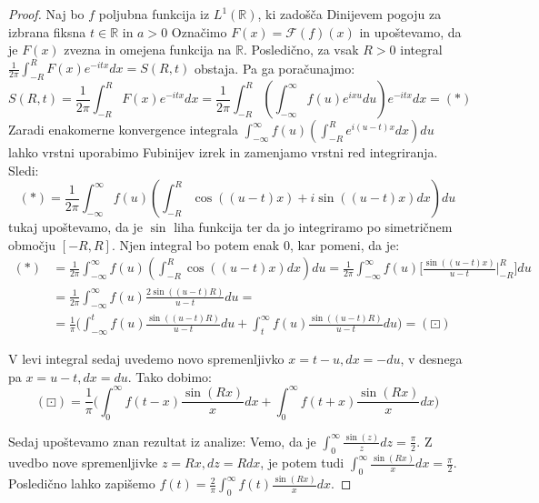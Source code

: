 \documentclass[a4paper, 10pt]{article}
\newcommand{\mth}[1]{\ensuremath{\mathbb{#1}}}
\newcommand{\R}{\mth{R}}
\begin{document}
			\begin{proof}
				Naj bo $f$ poljubna funkcija iz $L^1(\R)$, ki zadošča Dinijevem pogoju za izbrana fiksna $t\in\R$ in $a>0$ Označimo $F(x) = \mathcal{F}(f)(x)$ in upoštevamo, da je $F(x)$ zvezna in omejena funkcija na $\R$. Posledično, za vsak $R>0$ integral $\frac{1}{2\pi}\int_{-R}^{R}F(x)e^{-itx}dx = S(R, t)$ obstaja. Pa ga poračunajmo: $$
					S(R, t) = \frac{1}{2\pi}\int_{-R}^{R}F(x)e^{-itx}dx = \frac{1}{2\pi}\int_{-R}^{R}(\int_{-\infty}^{\infty}f(u)e^{ixu}du)e^{-itx}dx = (*)
				$$
				Zaradi enakomerne konvergence integrala $\int_{-\infty}^{\infty}f(u)(\int_{-R}^{R}e^{i(u-t)x}dx) du$ lahko vrstni uporabimo Fubinijev izrek in zamenjamo vrstni red integriranja. Sledi: $$
					(*) = \frac{1}{2\pi}\int_{-\infty}^{\infty}f(u)(\int_{-R}^{R}\cos((u-t)x) + i\sin((u-t)x) dx) du 
				$$
				tukaj upoštevamo, da je $\sin$ liha funkcija ter da jo integriramo po simetričnem območju $[-R, R]$. Njen integral bo potem enak $0$, kar pomeni, da je: \begin{align*}
					(*) &= \frac{1}{2\pi}\int_{-\infty}^{\infty}f(u)(\int_{-R}^{R}\cos((u-t)x)dx) du = \frac{1}{2\pi}\int_{-\infty}^{\infty}f(u)\big[\frac{\sin((u-t)x)}{u-t}|_{-R}^{R}\big]du \\
					&= \frac{1}{2\pi}\int_{-\infty}^{\infty}f(u)\frac{2\sin((u-t)R)}{u-t}du = \\
					&= \frac{1}{\pi}\big(\int_{-\infty}^{t}f(u)\frac{\sin((u-t)R)}{u-t}du + \int_{t}^{\infty}f(u)\frac{\sin((u-t)R)}{u-t}du\big) = (\boxdot)
				\end{align*}
				
				V levi integral sedaj uvedemo novo spremenljivko $x = t-u, dx = -du$, v desnega pa $x = u-t, dx = du$. Tako dobimo: $$
				(\boxdot) = \frac{1}{\pi}\big(\int_{0}^{\infty}f(t-x)\frac{\sin(Rx)}{x}dx + \int_{0}^{\infty}f(t+x)\frac{\sin(Rx)}{x}dx\big)
				$$
				
				Sedaj upoštevamo znan rezultat iz analize: Vemo, da je $\int_{0}^{\infty}\frac{\sin(z)}{z}dz = \frac{\pi}{2}$. Z uvedbo nove spremenljivke $z = Rx, dz = Rdx$, je potem tudi $\int_{0}^{\infty}\frac{\sin(Rx)}{x}dx = \frac{\pi}{2}$. Posledično lahko zapišemo $f(t) = \frac{2}{\pi}\int_{0}^{\infty}f(t)\frac{\sin(Rx)}{x}dx$.
				

\end{proof}
\end{document}
